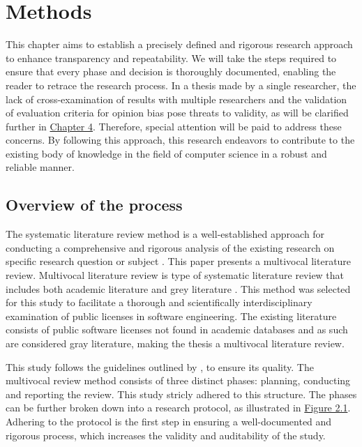 \chapter{Methods\label{methods}}
This chapter aims to establish a precisely defined and rigorous research approach to enhance transparency and repeatability. We will take the steps required to ensure that every phase and decision is thoroughly documented, enabling the reader to retrace the research process. In a thesis made by a single researcher, the lack of cross-examination of results with multiple researchers and the validation of evaluation criteria for opinion bias pose threats to validity, as will be clarified further in \hyperref[discussion]{Chapter 4}. Therefore, special attention will be paid to address these concerns. By following this approach, this research endeavors to contribute to the existing body of knowledge in the field of computer science in a robust and reliable manner.

\section{Overview of the process}
The systematic literature review method is a well-established approach for conducting a comprehensive and rigorous analysis of the existing research on specific research question or subject \citep{kitchenham2007}. This paper presents a multivocal literature review. Multivocal literature review is type of systematic literature review that includes both academic literature and grey literature \citep{mantyla2019}. This method was selected for this study to facilitate a thorough and scientifically interdisciplinary examination of public licenses in software engineering. The existing literature consists of public software licenses not found in academic databases and as such are considered gray literature, making the thesis a multivocal literature review.

This study follows the guidelines outlined by \cite{kitchenham2007}, to ensure its quality. The multivocal review method consists of three distinct phases: planning, conducting and reporting the review. This study stricly adhered to this structure. The phases can be further broken down into a research protocol, as illustrated in \hyperref[fig:slrphases]{Figure 2.1}. Adhering to the protocol is the first step in ensuring a well-documented and rigorous process, which increases the validity and auditability of the study.


